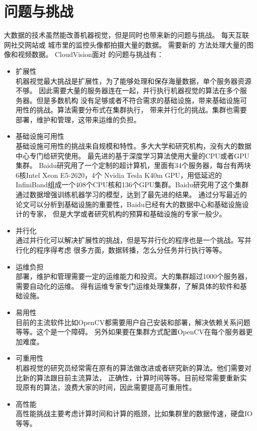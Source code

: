 \section{问题与挑战}
\label{sec:challenges}
大数据的技术虽然能改善机器视觉，但是同时也带来新的问题与挑战。
每天互联网社交网站或
城市里的监控头像都拍摄大量的数据。
需要新的 方法处理大量的图像和视频数据。
CloudVision面对 的问题与挑战有：
\begin{itemize}
  \item 扩展性 \\
        机器视觉最大挑战是扩展性，为了能够处理和保存海量数据，单个服务器资源不够。
        因此需要大量的服务器连在一起，并行执行机器视觉的算法在多个服务器。但是多数机构
        没有足够或者不符合需求的基础设施，带来基础设施可用性的挑战。算法需要分布式在集群执行，
        带来并行化的挑战。集群也需要部署，维护和管理，这带来运维的负担。
  \item 基础设施可用性 \\
        基础设施可用性的挑战来自规模和特性。多大大学和研究机构，没有大的数据中心专门给研究使用。
        最先进的基于深度学习算法使用大量的CPU或者GPU集群\cite{googlenet2015, google2015rethinking, baidup2015deepgpu}。
        Baidu研究用了一个定制的超计算机，里面有34个服务器，每台有两块6核Intel Xeon E5-2620，4个
        Nvidia Tesla K40m GPU，用低延迟的InfiniBand组成一个408个CPU核和136个GPU集群。Baidu研究用了这个集群
        通过数据增强训练机器学习的模型，达到了最先进的结果。\cite{baidup2015deepgpu}
        通过分写最近的论文可以分析到基础设施的重要性，Baidu已经有大的数据中心和基础设施设计的专家，
        但是大学或者研究机构的预算和基础设施的专家一般少。
  \item 并行化 \\
        通过并行化可以解决扩展性的挑战，但是写并行化的程序也是一个挑战。写并行化的程序得考虑
        很多方面，数据转播，怎么分任务并行执行等等。
  \item 运维负担 \\
        部署，维护和管理需要一定的运维能力和投资。大的集群超过1000个服务器，需要自动化的运维。
        得有运维专家专门运维处理集群，了解具体的软件和基础设施。
  \item 易用性 \\
        目前的主流软件比如OpenCV都需要用户自己安装和部署，解决依赖关系问题等等。这个是一个障碍。
        另外如果要在集群方式配置OpenCV在每个服务器更加难度。
  \item 可重用性 \\
        机器视觉的研究员经常需在原有的算法做改进或者研究新的算法。他们需要对比新的算法跟目前主流算法，
        正确性，计算时间等等。目前经常需要重新实现原有的算法，浪费大家的时间，因此需要提高可重用性。
  \item 高性能 \\
        高性能挑战主要考虑计算时间和计算的瓶颈，比如集群里的数据传速，硬盘IO等等。
\end{itemize}

